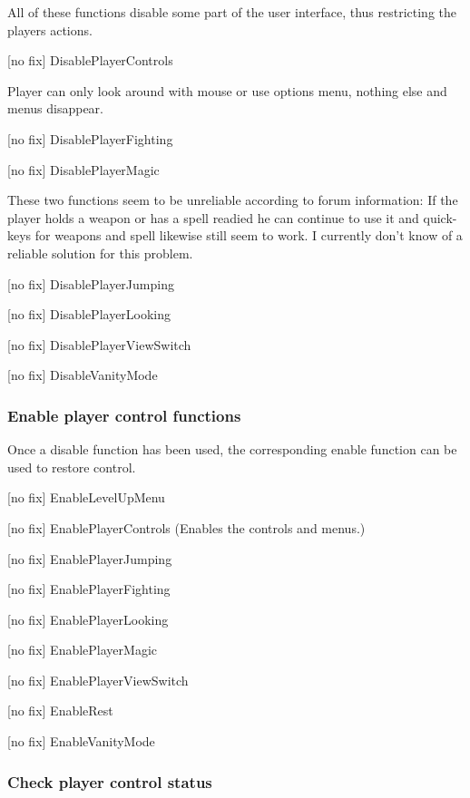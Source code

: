 All of these functions disable some part of the user interface, thus
restricting the players actions.

{[}no fix{]} DisablePlayerControls

Player can only look around with mouse or use options menu, nothing else
and menus disappear.

{[}no fix{]} DisablePlayerFighting

{[}no fix{]} DisablePlayerMagic

These two functions seem to be unreliable according to forum
information: If the player holds a weapon or has a spell readied he can
continue to use it and quick-keys for weapons and spell likewise still
seem to work. I currently don't know of a reliable solution for this
problem.

{[}no fix{]} DisablePlayerJumping

{[}no fix{]} DisablePlayerLooking

{[}no fix{]} DisablePlayerViewSwitch

{[}no fix{]} DisableVanityMode

\hypertarget{enable-player-control-functions}{%
\subsubsection{Enable player control
functions}\label{enable-player-control-functions}}

Once a disable function has been used, the corresponding enable function
can be used to restore control.

{[}no fix{]} EnableLevelUpMenu

{[}no fix{]} EnablePlayerControls (Enables the controls and menus.)

{[}no fix{]} EnablePlayerJumping

{[}no fix{]} EnablePlayerFighting

{[}no fix{]} EnablePlayerLooking

{[}no fix{]} EnablePlayerMagic

{[}no fix{]} EnablePlayerViewSwitch

{[}no fix{]} EnableRest

{[}no fix{]} EnableVanityMode

\hypertarget{check-player-control-status}{%
\subsubsection{Check player control
status}\label{check-player-control-status}}

